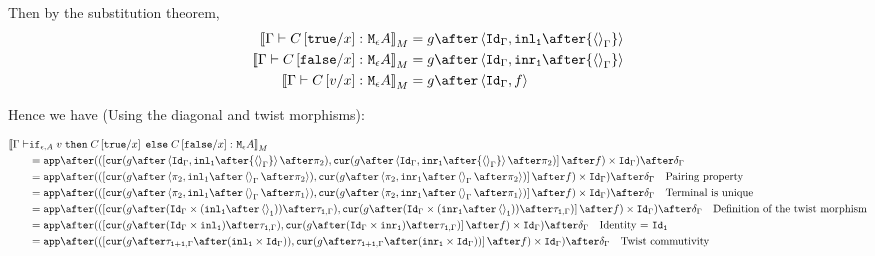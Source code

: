 {        Then by the substitution theorem,
        \begin{align}
            \deno{\typerelation{\G}{C\ssub{x}{\t}}{\mea}} & = g\after\pr{\idg}{\inl_\1\after{\term{\G}}}\\
            \deno{\typerelation{\G}{C\ssub{x}{\f}}{\mea}} & = g\after\pr{\idg}{\inr_\1\after{\term{\G}}}\\
            \deno{\gtyperelation{C\ssub{x}{v}}{\mea}} & = g\after\pr{\idg}{f}
        \end{align}

        Hence we have (Using the diagonal and twist morphisms):
     
        \begin{align}
            \deno{\gtyperelation{&\ifthenelse{\e}{A}{v}{C\ssub{x}{\t}}{C\ssub{x}{\f}}}{\mea}}  \\ 
            & = \ifMorph{f}{g\after\pr{\idg}{\inl_\1\after{\term{\G}}}}{g\after\pr{\idg}{\inr_\1\after{\term{\G}}}}\\
            & = \app\after((\fld{
                \cur{g\after\pr{\pp}{\inl_1\after\term{\G}\after\pp}}
            }{
                \cur{g\after\pr{\pp}{\inr_1\after\term{\G}\after\pp}}
            }\after f)\times \idg)\after\diag{\G}\qt{Pairing property}\\
            &= \app\after((\fld{
                \cur{g\after\pr{\pp}{\inl_1\after\term{\G}\after\p}}
            }{
                \cur{g\after\pr{\pp}{\inr_1\after\term{\G}\after\p}}
            }\after f)\times \idg)\after\diag{\G}\qt{Terminal is unique}\\
            &= \app\after((\fld{
                \cur{g\after(\idg\times (\inl_\1\after\term{\1}))\after\twist{\1}{\G}}
            }{
                \cur{g\after(\idg\times (\inr_\1\after\term{\1}))\after\twist{\1}{\G}}
            }\after f)\times \idg)\after\diag{\G}\qt{Definition of the twist morphism}\\
            & = \app\after((\fld{
                \cur{g\after(\idg\times \inl_\1)\after\twist{\1}{\G}}
            }{
                \cur{g\after(\idg\times \inr_\1)\after\twist{\1}{\G}}
            }\after f)\times \idg)\after\diag{\G}\qt{Identity = $\Id{\1}$}\\
            & = \app\after((\fld{
                \cur{g\after\twist{\1+\1}{\G}\after(\inl_\1\times \idg)}
            }{
                \cur{g\after\twist{\1+\1}{\G}\after(\inr_\1\times \idg)}
            }\after f)\times \idg)\after\diag{\G}\qt{Twist commutivity}\\

\end{align}}
